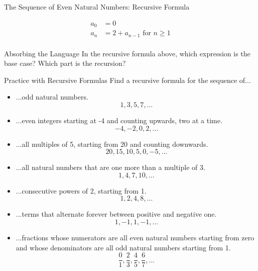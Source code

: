 \begin{example}{The Sequence of Even Natural Numbers: Recursive Formula}

\begin{align*}
a_0 &= 0 \\
a_n &= 2 + a_{n-1}\text{ for }n \geq 1\\ 
\end{align*} 

\end{example}
\begin{exercise}{Absorbing the Language \Coffeecup}
In the recursive formula above, which expression is the base case?  Which part is the recursion? 
\end{exercise}
\begin{exercise}{Practice with Recursive Formulas \Coffeecup \Coffeecup}
Find a recursive formula for the sequence of...
\begin{itemize}
\item ...odd natural numbers. $$1,3,5,7,\ldots$$
\item ...even integers starting at -4 and counting upwards, two at a time. $$-4,-2,0,2,\ldots$$
\item ...all multiples of 5, starting from 20 and counting downwards. $$20,15,10,5,0,-5,\ldots$$
\item ...all natural numbers that are one more than a multiple of 3. $$1,4,7,10,\ldots$$
\item ...consecutive powers of 2, starting from 1. $$1,2,4,8,\ldots$$
\item ...terms that alternate forever between positive and negative one. $$1,-1,1,-1,\ldots$$
\item ...fractions whose numerators are all even natural numbers starting from zero and whose denominators are all odd natural numbers starting from 1. $$\frac{0}{1},\frac{2}{3},\frac{4}{5},\frac{6}{7},\ldots$$
\end{itemize}
\end{exercise}
